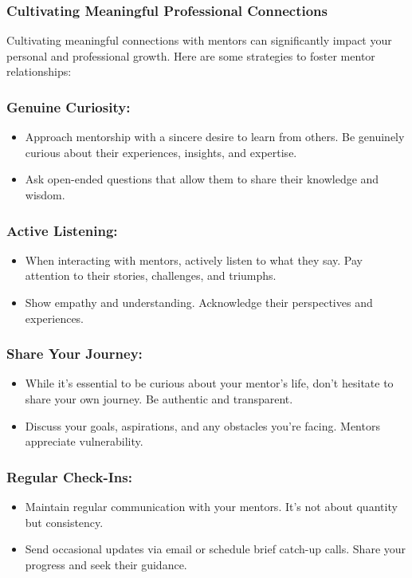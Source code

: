 \subsubsection*{Cultivating Meaningful Professional Connections}
Cultivating meaningful connections with mentors can significantly impact your personal and professional growth. Here are some strategies to foster mentor relationships:

\subsubsection*{Genuine Curiosity:}
\begin{itemize}[leftmargin=1.0cm]
\item Approach mentorship with a sincere desire to learn from others. Be genuinely curious about their experiences, insights, and expertise.
\item Ask open-ended questions that allow them to share their knowledge and wisdom.
\end{itemize}
\subsubsection*{Active Listening:}
\begin{itemize}[leftmargin=1.0cm]
\item When interacting with mentors, actively listen to what they say. Pay attention to their stories, challenges, and triumphs.
\item Show empathy and understanding. Acknowledge their perspectives and experiences.
\end{itemize}
\subsubsection*{Share Your Journey:}
\begin{itemize}[leftmargin=1.0cm]
\item While it's essential to be curious about your mentor's life, don't hesitate to share your own journey. Be authentic and transparent.
\item Discuss your goals, aspirations, and any obstacles you're facing. Mentors appreciate vulnerability.
\end{itemize}
\subsubsection*{Regular Check-Ins:}
\begin{itemize}[leftmargin=1.0cm]
\item Maintain regular communication with your mentors. It's not about quantity but consistency.
\item Send occasional updates via email or schedule brief catch-up calls. Share your progress and seek their guidance.
\end{itemize}
